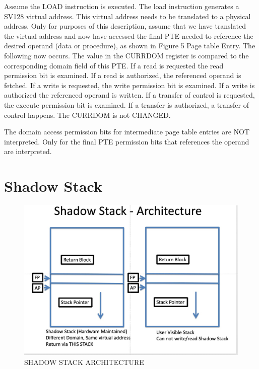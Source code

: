 \documentclass{article}
\begin{document}
Assume the LOAD instruction is executed.  The load instruction generates a SV128 virtual address.  This virtual address needs to be translated to a physical address.  Only for purposes of this description, assume that we have translated the virtual address and now have accessed the final PTE needed to reference the desired operand (data or procedure), as shown in Figure 5 Page table Entry.   The following now occurs.  The value in the CURRDOM register is compared to the corresponding domain field of this PTE.   If a read is requested the read permission bit is examined.  If a read is authorized,  the referenced operand is fetched.  If a write is requested,  the write permission bit is examined.  If a write is authorized the referenced operand is written.  If a transfer of control is requested,  the execute permission bit is examined.  If  a transfer is authorized,  a transfer of control happens.  The CURRDOM is not  CHANGED.

The domain access permission bits for intermediate page table entries are NOT interpreted.   Only for the final PTE permission bits that references the operand  are interpreted.

\pagebreak
\section{Shadow Stack}


\begin{figure}[h]
\begin{center}
\includegraphics[scale = .4]
{figures/figure6_shadow_stack.jpg}
\caption{SHADOW STACK  ARCHITECTURE}
\end{center}
\end{figure}
\end{document}
